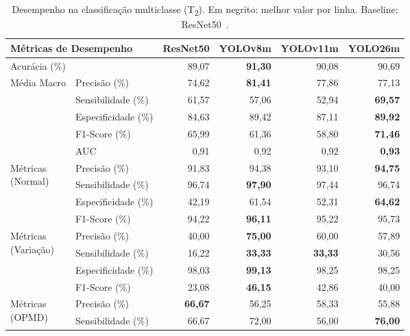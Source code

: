 \documentclass[12pt]{article}
\begin{document}
\begin{table}[tp]
  \centering
  \caption{Desempenho na classificação multiclasse
           (T\textsubscript{2}). Em negrito: melhor valor por linha.
           Baseline: ResNet50~\cite{smartom}.}
  \label{tab:multiclass}
  \small
  \begin{tabular}{llrrrr}
    \toprule
    \multicolumn{2}{l}{Métricas de Desempenho}
      & ResNet50 & YOLOv8m & YOLOv11m & YOLO26m \\
    \midrule
    \multicolumn{2}{l}{Acurácia (\%)}
      & 89,07 & \textbf{91,30} & 90,08 & 90,69 \\
    \midrule
    \multirow{5}{*}{Média Macro}
      & Precisão (\%)       & 74,62 & \textbf{81,41} & 77,86 & 77,13 \\
      & Sensibilidade (\%)  & 61,57 & 57,06 & 52,94 & \textbf{69,57} \\
      & Especificidade (\%) & 84,63 & 89,42 & 87,11 & \textbf{89,92} \\
      & F1-Score (\%)       & 65,99 & 61,36 & 58,80 & \textbf{71,46} \\
      & AUC                 & 0,91  & 0,92  & 0,92  & \textbf{0,93}  \\
    \midrule
    \multirow{4}{*}{\parbox{1.6cm}{Métricas\\(Normal)}}
      & Precisão (\%)       & 91,83 & 94,38 & 93,10 & \textbf{94,75} \\
      & Sensibilidade (\%)  & 96,74 & \textbf{97,90} & 97,44 & 96,74 \\
      & Especificidade (\%) & 42,19 & 61,54 & 52,31 & \textbf{64,62} \\
      & F1-Score (\%)       & 94,22 & \textbf{96,11} & 95,22 & 95,73 \\
    \midrule
    \multirow{4}{*}{\parbox{1.6cm}{Métricas\\(Variação)}}
      & Precisão (\%)       & 40,00 & \textbf{75,00} & 60,00 & 57,89 \\
      & Sensibilidade (\%)  & 16,22 & \textbf{33,33} & \textbf{33,33} & 30,56 \\
      & Especificidade (\%) & 98,03 & \textbf{99,13} & 98,25 & 98,25 \\
      & F1-Score (\%)       & 23,08 & \textbf{46,15} & 42,86 & 40,00 \\
    \midrule
    \multirow{4}{*}{\parbox{1.6cm}{Métricas\\(OPMD)}}
      & Precisão (\%)       & \textbf{66,67} & 56,25 & 58,33 & 55,88 \\
      & Sensibilidade (\%)  & 66,67 & 72,00 & 56,00 & \textbf{76,00} \\

\end{tabular}
\end{table}
\end{document}
